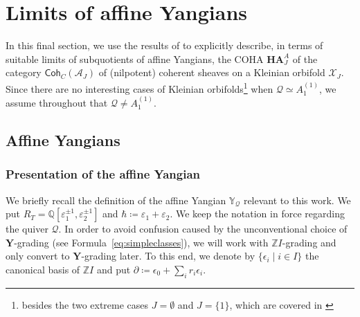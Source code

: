 \documentclass[reqno,a4paper]{amsart}
\newcommand{\calA}{\mathcal{A}}
\newcommand{\calX}{\mathcal{X}}
\newcommand{\Q}{\mathbb{Q}}
\newcommand{\Y}{\mathbb{Y}}
\newcommand{\Z}{\mathbb{Z}}
\newcommand{\bfY}{\mathbf{Y}}
\newcommand{\catCohC}{\mathsf{Coh}_C}
\newcommand{\qv}{\mathcal{Q}}
\newcommand{\rootlattice}{\bfY}
\newcommand{\coha}{\mathbf{HA}}
\theoremstyle{basic-theorem}
\numberwithin{equation}{section}
\begin{document}
\section{Limits of affine Yangians}\label{sec:limit-affine-Yangian}

In this final section, we use the results of \cite{DPSSV-3} to explicitly describe, in terms of suitable limits of subquotients of affine Yangians, the COHA $\coha_J^A$ of the category $\catCohC(\calA_J)$ of (nilpotent) coherent sheaves on a Kleinian orbifold $\calX_J$. Since there are no interesting cases of Kleinian orbifolds\footnote{besides the two extreme cases $J=\emptyset$ and $J=\{1\}$, which are covered in \cite{DPSSV-3}} when $\qv\simeq A_1^{(1)}$, we assume throughout that $\qv \neq A_1^{(1)}$.

\subsection{Affine Yangians}

\subsubsection{Presentation of the affine Yangian}

We briefly recall the definition of the affine Yangian $\Y_\qv$ relevant to this work. We put $R_T=\Q[\varepsilon^{\pm 1}_1, \varepsilon^{\pm 1}_2]$ and $\hbar\coloneqq \varepsilon_1+\varepsilon_2$. We keep the notation in force regarding the quiver $\qv$. In order to avoid confusion caused by the unconventional choice of $\rootlattice$-grading (see Formula~\ref{eq:simpleclasses}), we will work with $\Z I$-grading and only convert to $\rootlattice$-grading later. To this end, we denote by $\{\epsilon_i\;|\; i \in I\}$ the canonical basis of $\Z I$ and put $\partial\coloneq \epsilon_0 + \sum_i r_i \epsilon_i$.
\end{document}
